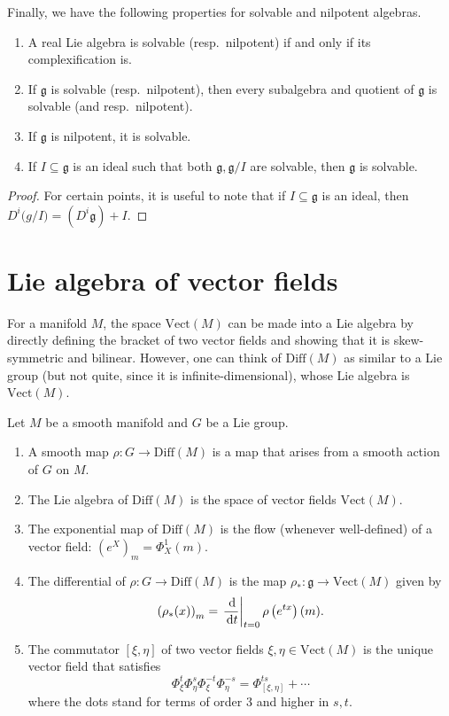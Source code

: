 \documentclass{report}
\begin{document}
Finally, we have the following properties for solvable and nilpotent algebras.
\begin{proposition}
    \begin{enumerate}[label = (\roman*)]
        \item A real Lie algebra is solvable (resp.\ nilpotent) if and only if its complexification is.
        \item If $\mathfrak g$ is solvable (resp.\ nilpotent), then every subalgebra and quotient of $\mathfrak g$ is solvable (and resp.\ nilpotent).
        \item If $\mathfrak g$ is nilpotent, it is solvable.
        \item If $I \subseteq \mathfrak g$ is an ideal such that both $\mathfrak g, \mathfrak g/I$ are solvable, then $\mathfrak g$ is solvable.
    \end{enumerate}
\end{proposition}
\begin{proof}
For certain points, it is useful to note that if $I\subseteq \mathfrak g$ is an ideal, then $D^i \mathfrak (g/I) = (D^i \mathfrak g) + I$.
\end{proof}

\section{Lie algebra of vector fields}
For a manifold $M$, the space $\mathrm{Vect}(M)$ can be made into a Lie algebra by directly defining the bracket of two vector fields and showing that it is skew-symmetric and bilinear.
However, one can think of $\mathrm{Diff}(M)$ as similar to a Lie group (but not quite, since it is infinite-dimensional), whose Lie algebra is $\mathrm{Vect}(M)$.
\begin{definition}
    Let $M$ be a smooth manifold and $G$ be a Lie group.
    \begin{enumerate}[label = (\roman*)]
        \item A smooth map $\rho: G \to \mathrm{Diff}(M)$ is a map that arises from a smooth action of $G$ on $M$.
        \item The Lie algebra of $\mathrm{Diff}(M)$ is the space of vector fields $\mathrm{Vect}(M)$.
        \item The exponential map of $\mathrm{Diff}(M)$ is the flow (whenever well-defined) of a vector field: $\left(e^X\right)_m = \Phi^1_X(m)$.
        \item The differential of $\rho: G \to \mathrm{Diff}(M)$ is the map $\rho_*: \mathfrak g \to \mathrm{Vect}(M)$ given by
        \[
        \left(\rho_*(x)\right)_m = \left.\frac{\,\mathrm{d}}{\,\mathrm{d} t}\right|_{t=0} \rho\left(e^{tx}\right)(m).
        \]
        \item The commutator $[\xi, \eta]$ of two vector fields $\xi, \eta \in \mathrm{Vect}(M)$ is the unique vector field that satisfies
        \[
        \Phi^t_\xi \Phi^s_\eta \Phi^{-t}_\xi \Phi^{-s}_\eta = \Phi^{ts}_{[\xi, \eta]} + \cdots
        \]
        where the dots stand for terms of order 3 and higher in $s,t$.
    \end{enumerate}
\end{definition}
\end{document}

